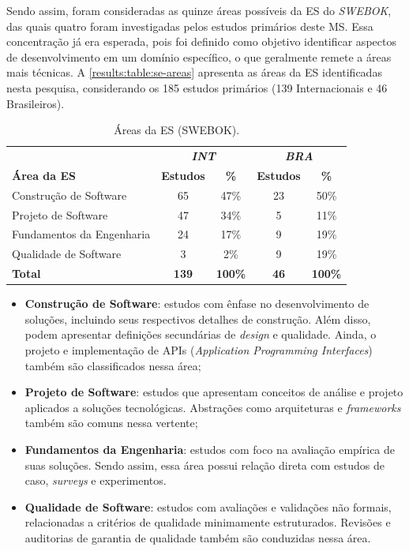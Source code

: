 Sendo assim, foram consideradas as quinze áreas possíveis da ES do \textit{SWEBOK}, das quais quatro foram investigadas pelos estudos primários deste MS. Essa concentração já era esperada, pois foi definido como objetivo identificar aspectos de desenvolvimento em um domínio específico, o que geralmente remete a áreas mais técnicas. A \autoref{results:table:se-areas} apresenta as áreas da ES identificadas nesta pesquisa, considerando os 185 estudos primários (139 Internacionais e 46 Brasileiros).

\begin{table}[htbp]
\caption{Áreas da ES (SWEBOK).}
\label{results:table:se-areas}
\centering
\begin{tabular}{lcccc}
\hline
                          & \multicolumn{2}{c}{\textbf{\textit{INT}}} & \multicolumn{2}{c}{\textbf{\textit{BRA}}} \\ \cline{2-5} 
\textbf{Área da ES}       & \textbf{Estudos} & \textbf{\%}             & \textbf{Estudos} & \textbf{\%}             \\ \hline
Construção de Software    & 65               & 47\%                    & 23               & 50\%                    \\ 
Projeto de Software       & 47               & 34\%                    & 5                & 11\%                    \\ 
Fundamentos da Engenharia & 24               & 17\%                    & 9                & 19\%                    \\ 
Qualidade de Software     & 3                & 2\%                     & 9                & 19\%                    \\ 
\textbf{Total}            & \textbf{139}     & \textbf{100\%} & \textbf{46}      & \textbf{100\%} \\ \hline
\end{tabular}
\fautor
\end{table}

\begin{itemize}
    \item \textbf{Construção de Software}: estudos com ênfase no desenvolvimento de soluções, incluindo seus respectivos detalhes de construção. Além disso, podem apresentar definições secundárias de \textit{design} e qualidade. Ainda, o projeto e implementação de APIs (\textit{Application Programming Interfaces}) também são classificados nessa área;
    \item \textbf{Projeto de Software}: estudos que apresentam conceitos de análise e projeto aplicados a soluções tecnológicas. Abstrações como arquiteturas e \textit{frameworks} também são comuns nessa vertente;
    \item \textbf{Fundamentos da Engenharia}: estudos com foco na avaliação empírica de suas soluções. Sendo assim, essa área possui relação direta com estudos de caso, \textit{surveys} e experimentos.
    \item \textbf{Qualidade de Software}: estudos com avaliações e validações não formais, relacionadas a critérios de qualidade minimamente estruturados. Revisões e auditorias de garantia de qualidade também são conduzidas nessa área.
\end{itemize}

